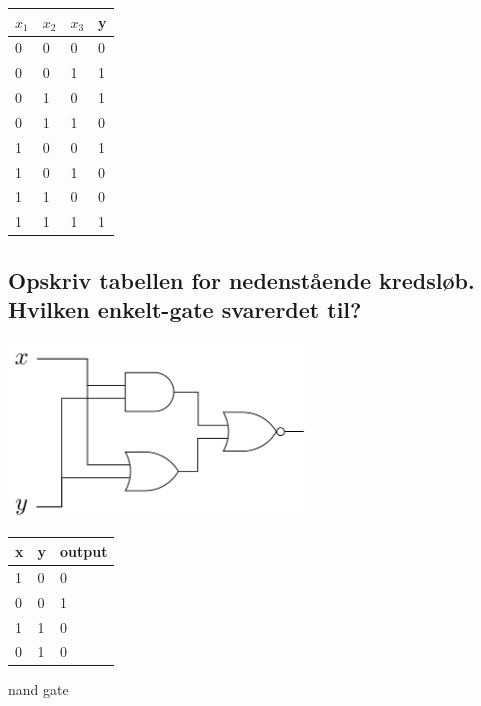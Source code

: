 \documentclass[12pt, a4paper]{article}
\begin{document}
						\begin{table}[h!]
						\begin{tabular}{|l|l|l|l|}
						\hline	
						$x_1$  & $x_2$  & $x_3$  & y \\ \hline
						0    & 0    & 0    & 0 \\ \hline
						0    & 0    & 1    & 1 \\ \hline
						0    & 1    & 0    & 1 \\ \hline
						0    & 1    & 1    & 0 \\ \hline
						1    & 0    & 0    & 1 \\ \hline
						1    & 0    & 1    & 0 \\ \hline
						1    & 1    & 0    & 0 \\ \hline
						1    & 1    & 1    & 1 \\ \hline
						\end{tabular}
						\end{table}
						
					\subsection{Opskriv tabellen for nedenstående kredsløb. Hvilken enkelt-gate svarerdet til?}
						\includegraphics[width=300px]{images/38.1.1.png}
						\begin{table}[h!]
						\begin{tabular}{|l|l|l|}
						\hline
						x & y & output \\ \hline
						1 & 0 & 0      \\ \hline
						0 & 0 & 1      \\ \hline
						1 & 1 & 0      \\ \hline
						0 & 1 & 0      \\ \hline
						\end{tabular}
						\end{table}
						nand gate
\end{document}
